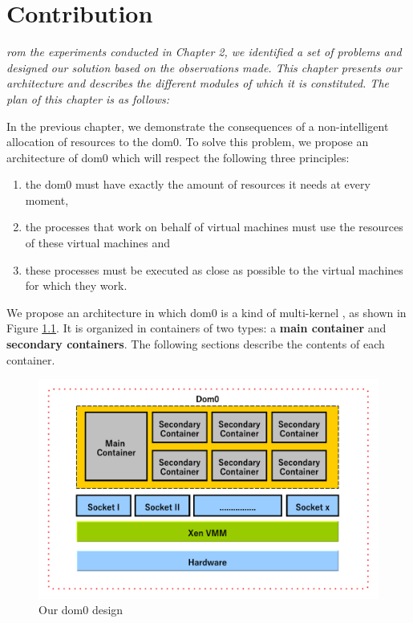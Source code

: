 \chapter{Contribution}
\label{chap:contrib}
\textit{rom the experiments conducted in Chapter 2, we identified a set of problems and designed our solution based on the observations made. This chapter presents our architecture and describes the different modules of which it is constituted. The plan of this chapter is as follows:
}

\minitoc

\newpage
In the previous chapter, we demonstrate the consequences of a non-intelligent allocation of resources to the dom0. To solve this problem, we propose an architecture of dom0 which will respect the following three principles:

\begin{enumerate}
    \item the dom0 must have exactly the amount of resources it needs at every moment,
    \item the processes that work on behalf of virtual machines must use the resources of these virtual machines and 
    \item these processes must be executed as close as possible to the virtual machines for which they work.
\end{enumerate}

We propose an architecture in which dom0 is a kind of multi-kernel \citep{multikernel}, as shown in Figure \ref{fig:multidom0}. It is organized in containers of two types: a \textbf{main container} and \textbf{secondary containers}. The following sections describe the contents of each container.

\begin{figure}[!h]
    \centering
    \includegraphics[width=\linewidth]{fig04/multidom0.pdf}
    \caption{Our dom0 design}
    \label{fig:multidom0}
\end{figure}

